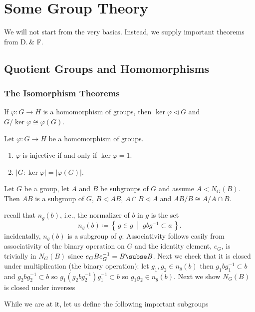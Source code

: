 \chapter{Some Group Theory}
We will not start from the very basics. Instead, we supply important
theorems from D.\,\& F.
\section{Quotient Groups and Homomorphisms}
\subsection{The Isomorphism Theorems}
\begin{theorem*}[16]
If $\varphi\colon G\to H$ is a homomorphism of groups, then
$\ker\varphi\lhd G$ and $G/{\ker\varphi}\cong\varphi(G)$.
\end{theorem*}
\begin{theorem*}[17]
Let $\varphi\colon G\to H$ be a homomorphism of groups.
\begin{enumerate}[noitemsep,label=(\alph*)]
\item $\varphi$ is injective if and only if $\ker\varphi=1$.
\item $|G:\ker\varphi|=|\varphi(G)|$.
\end{enumerate}
\end{theorem*}
\begin{theorem*}[18]
Let $G$ be a group, let $A$ and $B$ be subgroups of $G$ and assume
$A<N_G(B)$. Then $AB$ is a subgroup of $G$, $B\lhd AB$, $A\cap B\lhd A$ and
$AB/B\cong A/A\cap B$.
\end{theorem*}
recall that $n_g(b)$, i.e., the normalizer of $b$ in $g$ is the set
\[
n_g(b)\coloneqq\left\{\,g\in g\;\middle|\;gbg^{-1}\subset a\,\right\}.
\]
incidentally, $n_g(b)$ is a subgroup of $g$: Associativity follows easily
from associativity of the binary operation on $G$ and the identity element,
$e_G$, is trivially in $N_G(B)$ since $e_GBe_G^{-1}=B\subse B$. Next we
check that it is closed under multiplication (the binary operation): let
$g_1,g_2\in n_g(b)$ then $g_1bg_1^{-1}\subset b$ and $g_2bg_2^{-1}\subset
b$ so $g_1(g_2 bg_2^{-1})g_1^{-1}\subset b$ so $g_1g_2\in n_g(b)$. Next we
show $N_G(B)$ is closed under inverses

While we are at it, let us define the following important subgroups

